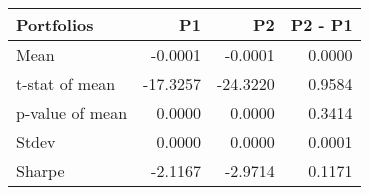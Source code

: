 \begin{tabular}{lrrr}
\toprule
Portfolios & P1 & P2 & P2 - P1 \\
\midrule
Mean & -0.0001 & -0.0001 & 0.0000 \\
t-stat of mean & -17.3257 & -24.3220 & 0.9584 \\
p-value of mean & 0.0000 & 0.0000 & 0.3414 \\
Stdev & 0.0000 & 0.0000 & 0.0001 \\
Sharpe & -2.1167 & -2.9714 & 0.1171 \\
\bottomrule
\end{tabular}

